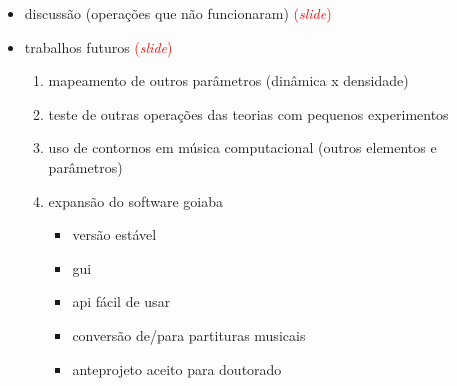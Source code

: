 \documentclass[12pt,a4paper]{article}
\newcommand{\slide}{\textcolor{red}{(\textit{slide})}}
\begin{document}
\begin{itemize}
\item discussão (operações que não funcionaram) \slide{}
\item trabalhos futuros \slide{}
  \begin{enumerate}
  \item mapeamento de outros parâmetros (dinâmica x densidade)
  \item teste de outras operações das teorias com pequenos experimentos
  \item uso de contornos em música computacional (outros elementos e parâmetros)
  \item expansão do software goiaba
    \begin{itemize}
    \item versão estável
    \item gui
    \item api fácil de usar
    \item conversão de/para partituras musicais
    \item anteprojeto aceito para doutorado
    \end{itemize}
  \end{enumerate}
\end{itemize}
\end{document}
